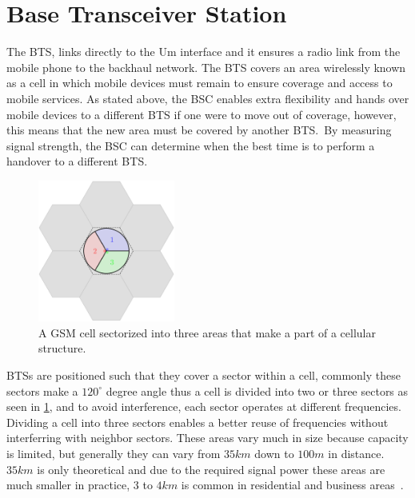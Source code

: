 \section{Base Transceiver Station}
The \gls{BTS}, links directly to the Um interface and it ensures a
radio link from the mobile phone to the backhaul network. The
\gls{BTS} covers an area wirelessly known as a cell in which mobile
devices must remain to ensure coverage and access to mobile
services. As stated above, the \gls{BSC} enables extra flexibility and
hands over mobile devices to a different BTS if one were to move out
of coverage, however, this means that the new area must be covered by
another BTS.\ By measuring signal strength, the \gls{BSC} can
determine when the best time is to perform a handover to a different
\gls{BTS}.\

\begin{figure}[H]
  \centering
  \includegraphics[width=0.4\textwidth]{figures/gsm_cell}
  \caption{A \gls{GSM} cell sectorized into three areas that make a
    part of a cellular structure.}
  \label{fig:gsm_cell}
\end{figure}

\gls{BTS}s are positioned such that they cover a sector within a cell,
commonly these sectors make a $120^{\circ}$ degree angle thus a cell
is divided into two or three sectors as seen in \cref{fig:gsm_cell},
and to avoid interference, each sector operates at different
frequencies. Dividing a cell into three sectors enables a better reuse
of frequencies without interferring with neighbor sectors. These areas
vary much in size because capacity is limited, but generally they can
vary from $35km$ down to $100m$ in distance. $35km$ is only
theoretical and due to the required signal power these areas are much
smaller in practice, $3$ to $4km$ is common in residential and
business areas~\cite[p. 23]{gsmtolte}.

